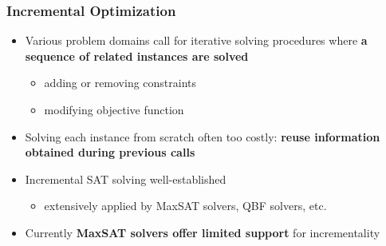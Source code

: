 \documentclass[aspectratio=169 %
,serif,mathserif]{beamer}
\begin{document}
\begin{frame}
	\frametitle{Incremental Optimization}
	\begin{itemize}
		\item Various problem domains call for iterative solving procedures where \textbf{a sequence of related instances are solved}
		\begin{itemize}
			\item adding or removing constraints
			\item modifying objective function
		\end{itemize} \pause
		\item Solving each instance from scratch often too costly: \textbf{reuse information obtained during previous calls} \pause
		\item Incremental SAT solving well-established
		\begin{itemize}
			\item extensively applied by MaxSAT solvers, QBF solvers, etc.
		\end{itemize} \pause
		\item Currently \textbf{MaxSAT solvers offer limited support} for incrementality
	\end{itemize}
\end{frame}
\end{document}
